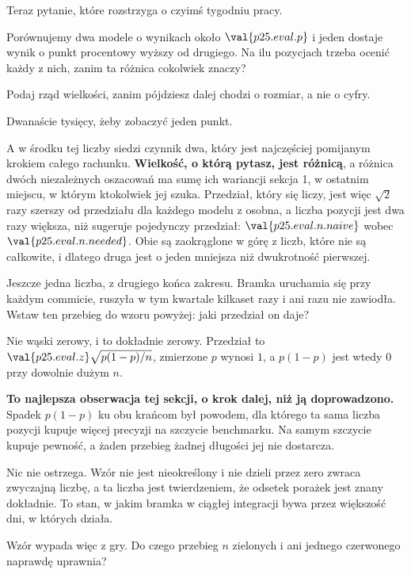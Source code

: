 \begin{fr}
Teraz pytanie, które rozstrzyga o czyimś tygodniu pracy.

Porównujemy dwa modele o wynikach około $\val{p25.eval.p}$ i jeden dostaje
wynik o punkt procentowy wyższy od drugiego. Na ilu pozycjach trzeba ocenić
każdy z nich, zanim ta różnica cokolwiek znaczy?

Podaj rząd wielkości, zanim pójdziesz dalej \dash{} chodzi o rozmiar, a nie o
cyfry.
\dotline
\nextframe
\end{fr}

\begin{fr}

Dwanaście tysięcy, żeby zobaczyć jeden punkt.

A w środku tej liczby siedzi czynnik dwa, który jest najczęściej pomijanym
krokiem całego rachunku. \textbf{Wielkość, o którą pytasz, jest różnicą}, a
różnica dwóch niezależnych oszacowań ma sumę ich wariancji \dash{} sekcja 1, w
ostatnim miejscu, w którym ktokolwiek jej szuka. Przedział, który się liczy,
jest więc $\sqrt{2}$ razy szerszy od przedziału dla każdego modelu z osobna, a
liczba pozycji jest dwa razy większa, niż sugeruje pojedynczy przedział:
$\val{p25.eval.n.naive}$ wobec $\val{p25.eval.n.needed}$. Obie są zaokrąglone
w górę z liczb, które nie są całkowite, i dlatego druga jest o jeden mniejsza
niż dwukrotność pierwszej.

Jeszcze jedna liczba, z drugiego końca zakresu. Bramka uruchamia się przy
każdym commicie, ruszyła w tym kwartale kilkaset razy i ani razu nie zawiodła.
Wstaw ten przebieg do wzoru powyżej: jaki przedział on daje?
\dotline
\nextframe
\end{fr}

\begin{fr}

Nie wąski \dash{} zerowy, i to dokładnie zerowy. Przedział to
$\val{p25.eval.z}\sqrt{p(1-p)/n}$, zmierzone $p$ wynosi $1$, a $p(1-p)$ jest
wtedy $0$ przy dowolnie dużym $n$.

\textbf{To najlepsza obserwacja tej sekcji, o krok dalej, niż ją
doprowadzono.} Spadek $p(1-p)$ ku obu krańcom był powodem, dla którego ta sama
liczba pozycji kupuje więcej precyzji na szczycie benchmarku. Na samym
szczycie kupuje pewność, a żaden przebieg żadnej długości jej nie dostarcza.

Nic nie ostrzega. Wzór nie jest nieokreślony i nie dzieli przez zero \dash{}
zwraca zwyczajną liczbę, a ta liczba jest twierdzeniem, że odsetek porażek
jest znany dokładnie. To stan, w jakim bramka w ciągłej integracji bywa przez
większość dni, w których działa.

Wzór wypada więc z gry. Do czego przebieg $n$ zielonych i ani jednego
czerwonego naprawdę uprawnia?
\dotline
\nextframe
\end{fr}

